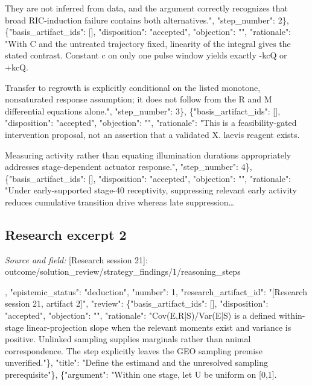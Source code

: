 \documentclass[11pt]{article}
\begin{document}
They are not inferred from data, and the argument correctly recognizes that broad RIC-induction failure contains both alternatives.", "step\_number": 2\}, \{"basis\_artifact\_ids": [], "disposition": "accepted", "objection": "", "rationale": "With C and the untreated trajectory fixed, linearity of the integral gives the stated contrast. Constant c on only one pulse window yields exactly -kcQ or +kcQ.

Transfer to regrowth is explicitly conditional on the listed monotone, nonsaturated response assumption; it does not follow from the R and M differential equations alone.", "step\_number": 3\}, \{"basis\_artifact\_ids": [], "disposition": "accepted", "objection": "", "rationale": "This is a feasibility-gated intervention proposal, not an assertion that a validated X. laevis reagent exists.

Measuring activity rather than equating illumination durations appropriately addresses stage-dependent actuator response.", "step\_number": 4\}, \{"basis\_artifact\_ids": [], "disposition": "accepted", "objection": "", "rationale": "Under early-supported stage-40 receptivity, suppressing relevant early activity reduces cumulative transition drive whereas late suppression\ldots{}

\subsection{Research excerpt 2}
\textit{Source and field: }[Research session 21]: outcome/solution\_review/strategy\_findings/1/reasoning\_steps\par
[\{"argument": "Let E\_i denote an animal's early wound-response measurement, R\_i its later epidermal RIC/ECM-transition measurement, and S\_i developmental stage. An animal-level coupling estimand is the within-stage slope Cov(E,R|S)/Var(E|S), when the variance is positive. Measurements from different animals at different times estimate marginal distributions, not this joint distribution. Whether the actual GEO samples provide animal linkage, independent animals, pools, or only technical/library replication remains unverified.

Pool-level results must not be represented as animal-level prediction.", "basis\_artifact\_ids": [], "epistemic\_status": "deduction", "number": 1, "research\_artifact\_id": "[Research session 21, artifact 2]", "review": \{"basis\_artifact\_ids": [], "disposition": "accepted", "objection": "", "rationale": "Cov(E,R|S)/Var(E|S) is a defined within-stage linear-projection slope when the relevant moments exist and variance is positive. Unlinked sampling supplies marginals rather than animal correspondence. The step explicitly leaves the GEO sampling premise unverified."\}, "title": "Define the estimand and the unresolved sampling prerequisite"\}, \{"argument": "Within one stage, let U be uniform on [0,1].
\end{document}
